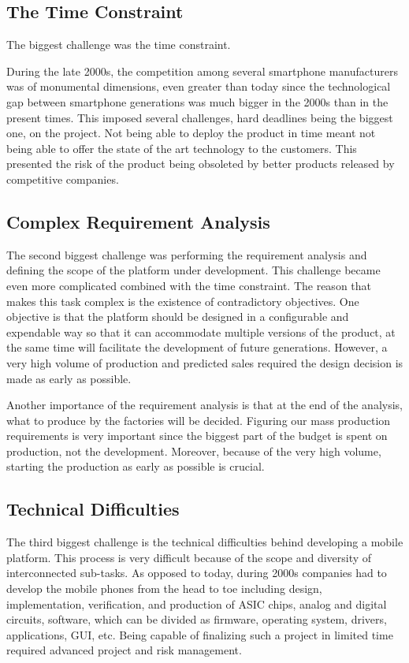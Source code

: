 \documentclass[journal]{IEEEtran}
\begin{document}
\subsection{The Time Constraint}
The biggest challenge was the time constraint. 

During the late 2000s, the competition among several smartphone manufacturers was of monumental dimensions, even greater than today since the technological gap between smartphone generations was much bigger in the 2000s than in the present times. This imposed several challenges, hard deadlines being the biggest one, on the project. Not being able to deploy the product in time meant not being able to offer the state of the art technology to the customers. This presented the risk of the product being obsoleted by better products released by competitive companies.

\subsection{Complex Requirement Analysis}
The second biggest challenge was performing the requirement analysis and defining the scope of the platform under development. This challenge became even more complicated combined with the time constraint. The reason that makes this task complex is the existence of contradictory objectives. One objective is that the platform should be designed in a configurable and expendable way so that it can accommodate multiple versions of the product, at the same time will facilitate the development of future generations. However, a very high volume of production and predicted sales required the design decision is made as early as possible.

Another importance of the requirement analysis is that at the end of the analysis, what to produce by the factories will be decided. Figuring our mass production requirements is very important since the biggest part of the budget is spent on production, not the development. Moreover, because of the very high volume, starting the production as early as possible is crucial. 

\subsection{Technical Difficulties}
The third biggest challenge is the technical difficulties behind developing a mobile platform. This process is very difficult because of the scope and diversity of interconnected sub-tasks. As opposed to today, during 2000s companies had to develop the mobile phones from the head to toe including design, implementation, verification, and production of ASIC chips, analog and digital circuits, software, which can be divided as firmware, operating system, drivers, applications, GUI, etc. Being capable of finalizing such a project in limited time required advanced project and risk management. 
\end{document}
